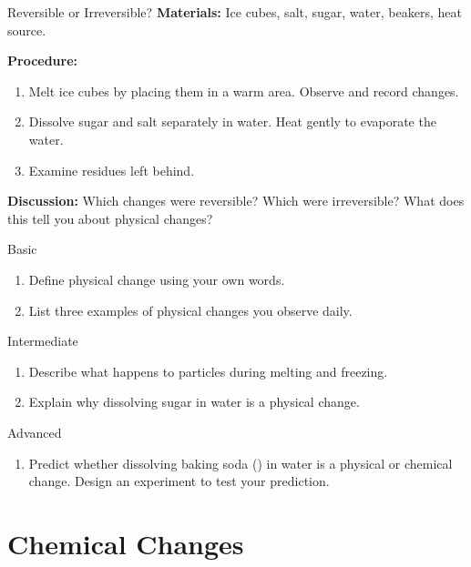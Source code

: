 \begin{investigation}{Reversible or Irreversible?}
\textbf{Materials:} Ice cubes, salt, sugar, water, beakers, heat source.

\textbf{Procedure:}
\begin{enumerate}
    \item Melt ice cubes by placing them in a warm area. Observe and record changes.
    \item Dissolve sugar and salt separately in water. Heat gently to evaporate the water.
    \item Examine residues left behind. 
\end{enumerate}

\textbf{Discussion:}
Which changes were reversible? Which were irreversible? What does this tell you about physical changes?
\end{investigation}

\begin{tieredquestions}{Basic}
\begin{enumerate}
    \item Define physical change using your own words.
    \item List three examples of physical changes you observe daily.
\end{enumerate}
\end{tieredquestions}

\begin{tieredquestions}{Intermediate}
\begin{enumerate}
    \item Describe what happens to particles during melting and freezing.
    \item Explain why dissolving sugar in water is a physical change.
\end{enumerate}
\end{tieredquestions}

\begin{tieredquestions}{Advanced}
\begin{enumerate}
    \item Predict whether dissolving baking soda () in water is a physical or chemical change. Design an experiment to test your prediction.
\end{enumerate}
\end{tieredquestions}

\section{Chemical Changes}


